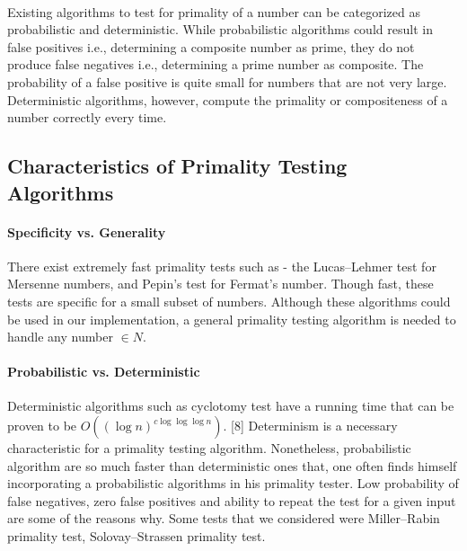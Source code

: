\documentclass[paper=a4, fontsize=11pt]{scrartcl}	%
\numberwithin{equation}{section}		%
\numberwithin{figure}{section}		%
\numberwithin{table}{section}		%
\begin{document}
\paragraph{} Existing algorithms to test for primality of a number can be categorized as probabilistic and deterministic. While probabilistic algorithms could result in false positives i.e., determining a composite number as prime, they do not produce false negatives i.e., determining a prime number as composite. The probability of a false positive is quite small for numbers that are not very large. Deterministic algorithms, however, compute the primality or compositeness of a number correctly every time.\\

\subsection{Characteristics of Primality Testing Algorithms}
\paragraph {Specificity vs. Generality}
There exist extremely fast primality tests such as - the Lucas--Lehmer test for Mersenne numbers, and Pepin's test for Fermat's number. Though fast, these tests are specific for a small subset of numbers. Although these algorithms could be used in our implementation, a general primality testing algorithm is needed to handle any number $\in N$.

\paragraph{ Probabilistic vs. Deterministic}
Deterministic algorithms such as cyclotomy test have a running time that can be proven to be $O((\log n)^{c\log \log \log n})$. [8] Determinism is a necessary characteristic for a primality testing algorithm. Nonetheless, probabilistic algorithm are so much faster than deterministic ones that, one often finds himself incorporating a probabilistic algorithms in his primality tester. Low probability of false negatives, zero false positives and ability to repeat the test for a given input are some of the reasons why. Some tests that we considered were Miller--Rabin primality test, Solovay--Strassen primality test. 
\end{document}
